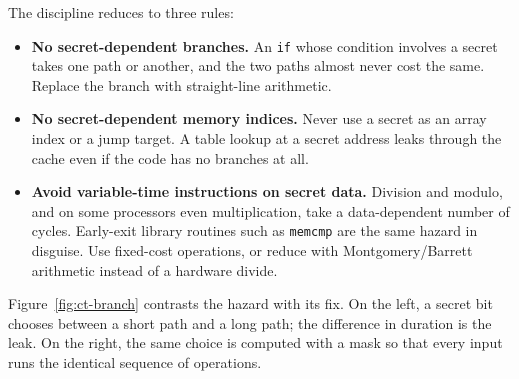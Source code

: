 The discipline reduces to three rules:

\begin{itemize}
  \item \textbf{No secret-dependent branches.} An \texttt{if} whose condition
        involves a secret takes one path or another, and the two paths almost never
        cost the same. Replace the branch with straight-line arithmetic.
  \item \textbf{No secret-dependent memory indices.} Never use a secret as an array
        index or a jump target. A table lookup at a secret address leaks through the
        cache even if the code has no branches at all.
  \item \textbf{Avoid variable-time instructions on secret data.} Division and modulo,
        and on some processors even multiplication, take a data-dependent number of
        cycles. Early-exit library routines such as \texttt{memcmp} are the same
        hazard in disguise. Use fixed-cost operations, or reduce with Montgomery/Barrett
        arithmetic instead of a hardware divide.
\end{itemize}

Figure~\ref{fig:ct-branch} contrasts the hazard with its fix. On the left, a secret
bit chooses between a short path and a long path; the difference in duration is the
leak. On the right, the same choice is computed with a mask so that every input runs
the identical sequence of operations.

